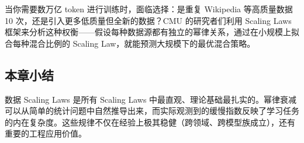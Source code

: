当你需要数万亿 token 进行训练时，面临选择：是重复 Wikipedia 等高质量数据 10 次，还是引入更多低质量但全新的数据？CMU 的研究者们利用 Scaling Laws 框架来分析这种权衡——假设每种数据源都有独立的幂律关系，通过在小规模上拟合每种混合比例的 Scaling Law，就能预测大规模下的最优混合策略。

\subsection{本章小结}

数据 Scaling Laws 是所有 Scaling Laws 中最直观、理论基础最扎实的。幂律衰减可以从简单的统计问题中自然推导出来，而实际观测到的缓慢指数反映了学习任务的内在复杂度。这些规律不仅在经验上极其稳健（跨领域、跨模型族成立），还有重要的工程应用价值。



